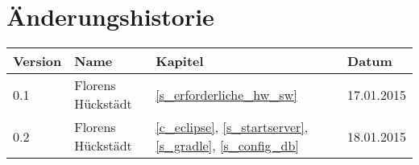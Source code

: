 %
%

\noindent
\chapter*{Änderungshistorie}
\begin{tabularx}{\textwidth}{|l|X|l|l|} \hline
       \textbf{Version}  	& \textbf{Name}   	& \textbf{Kapitel}  						& \textbf{Datum}\\ \hline
       0.1           		& Florens Hückstädt & \ref{s_erforderliche_hw_sw} 				& 17.01.2015\\
       0.2           		& Florens Hückstädt & \ref{c_eclipse}, \ref{s_startserver}, \ref{s_gradle}, \ref{s_config_db} 		& 18.01.2015\\
        \hline
\end{tabularx}

